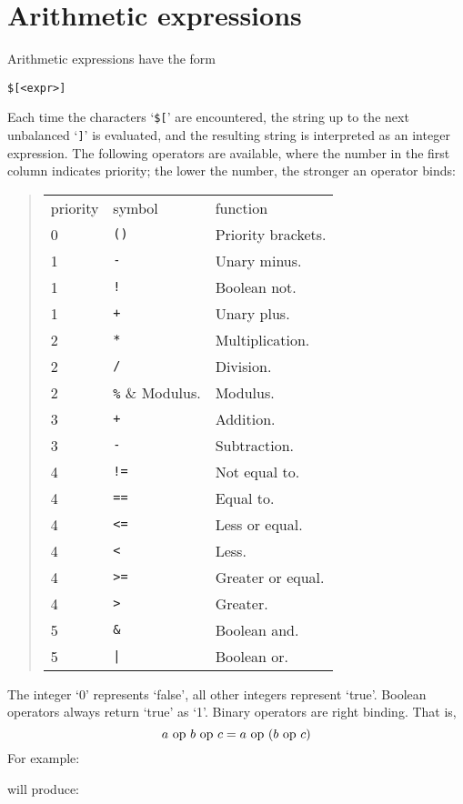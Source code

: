 \section{Arithmetic expressions}
\label{s.intexpr}
Arithmetic expressions have the form
\begin{verbatim}
$[<expr>]
\end{verbatim}
Each time the characters `{\tt \$[}' are encountered,
the string up to the next unbalanced `{\tt ]}' is evaluated,
and the resulting string is
interpreted as an integer expression.
The following operators are available, where the number in the first column
indicates priority; the lower the number, the stronger an operator binds:
\begin{quote}
\begin{tabular}{lll}
priority & symbol & function \\
0 & \verb'()' & Priority brackets. \\
1 & \verb'-' & Unary minus. \\
1 & \verb'!' & Boolean not. \\
1 & \verb'+' & Unary plus. \\
2 & \verb'*' & Multiplication. \\
2 & \verb'/' & Division. \\
2 & \verb'%' & Modulus. \\
3 & \verb'+' & Addition. \\
3 & \verb'-' & Subtraction.\\
4 & \verb'!=' & Not equal to. \\
4 & \verb'==' & Equal to. \\
4 & \verb'<=' & Less or equal. \\
4 & \verb'<' & Less. \\
4 & \verb'>=' & Greater or equal. \\
4 & \verb'>' & Greater. \\
5 & \verb'&' & Boolean and. \\
5 & \verb'|' & Boolean or. \\
\end{tabular}
\end{quote}
The integer `0' represents `false',
all other integers represent `true'.
Boolean operators always return `true' as `1'.
Binary operators are right binding.
That is,
\[ a\ {\rm op}\ b\ {\rm op}\ c = a\ {\rm op}\ (b\ {\rm op}\ c) \]
For example:

will produce:


